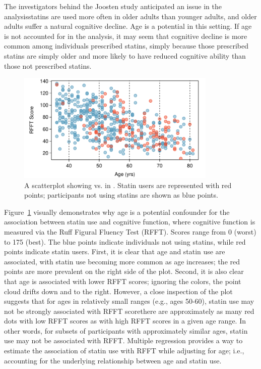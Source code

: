 The investigators behind the Joosten study anticipated an issue in the analysis\textemdash statins are used more often in older adults than younger adults, and older adults suffer a natural cognitive decline. Age is a potential  in this setting. If age is not accounted for in the analysis, it may seem that cognitive decline is more common among individuals prescribed statins, simply because those prescribed statins are simply older and more likely to have reduced cognitive ability than those not prescribed statins.

\textD{\newpage}

\begin{figure}[t]
	\centering
	\includegraphics[width=0.85\textwidth]
	{ch_multiple_linear_regression_oi_biostat/figures/prevendAgeRFFTConfounderPlot/prevendAgeRFFTConfounderPlot}
	\caption{A scatterplot showing  vs.  in . Statin users are represented with red points; participants not using statins are shown as blue points.}
	\label{prevendAgeRFFTConfounderPlot}
\end{figure}

Figure~\ref{prevendAgeRFFTConfounderPlot} visually demonstrates why age is a potential confounder for the association between statin use and cognitive function, where cognitive function is measured via the Ruff Figural Fluency Test (RFFT). Scores range from 0 (worst) to 175 (best). The blue points indicate individuals not using statins, while red points indicate statin users. First, it is clear that age and statin use are associated, with statin use becoming more common as age increases; the red points are more prevalent on the right side of the plot. Second, it is also clear that age is associated with lower RFFT scores; ignoring the colors, the point cloud drifts down and to the right. However, a close inspection of the plot suggests that for ages in relatively small ranges (e.g., ages 50-60), statin use may not be strongly associated with RFFT score\textemdash there are approximately as many red dots with low RFFT scores as with high RFFT scores in a given age range. In other words, for subsets of participants with approximately similar ages, statin use may not be associated with RFFT. Multiple regression provides a way to estimate the association of statin use with RFFT while adjusting for age; i.e., accounting for the underlying relationship between age and statin use.


